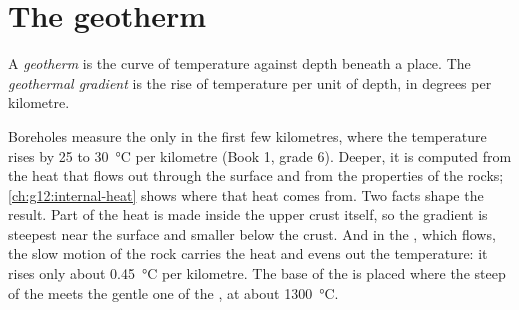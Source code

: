 \section{The geotherm}

\begin{definition}\label{def:g11:lithosphere-asthenosphere:geotherm}
A \emph{geotherm} is the curve of temperature against depth
beneath a place. The \emph{geothermal gradient} is
the rise of temperature per unit of depth, in degrees per kilometre.
\end{definition}

Boreholes measure the  only in the first few kilometres, where the
temperature rises by 25 to \qty{30}{\celsius} per kilometre (Book 1,
grade 6). Deeper, it is computed from the heat that flows out through the
surface and from the properties of the rocks; \cref{ch:g12:internal-heat}
shows where that heat comes from. Two facts shape the result. Part of the
heat is made inside the upper crust itself, so the gradient is steepest near
the surface and smaller below the crust. And in the , which
flows, the slow motion of the rock carries the heat and evens out the
temperature: it rises only about \qty{0.45}{\celsius} per kilometre. The
base of the  is placed where the steep  of the 
meets the gentle one of the , at about \qty{1300}{\celsius}.

